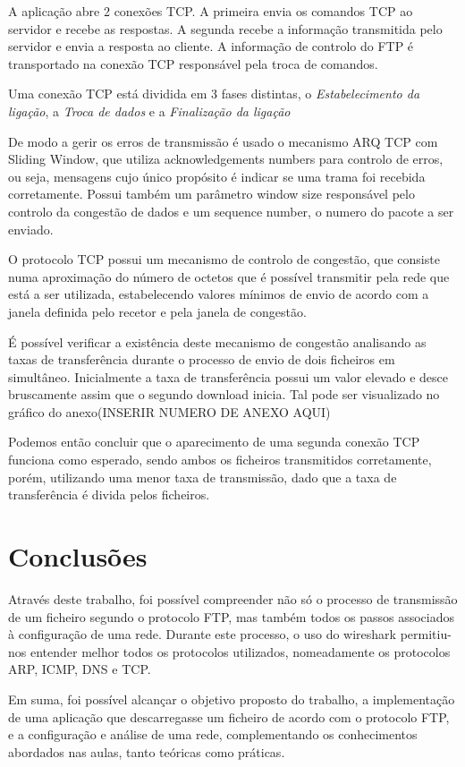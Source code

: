 \documentclass[11pt]{article}
\begin{document}
A aplicação abre 2 conexões TCP. A primeira envia os comandos TCP ao servidor e recebe as respostas. A segunda recebe a informação transmitida pelo servidor e envia a resposta ao cliente. A informação de controlo do FTP é transportado na conexão TCP responsável pela troca de comandos.

Uma conexão TCP está dividida em 3 fases distintas, o \emph{Estabelecimento da ligação}, a \emph{Troca de dados} e a \emph{Finalização da ligação}


De modo a gerir os erros de transmissão é usado o mecanismo ARQ TCP com Sliding Window, que utiliza acknowledgements numbers para controlo de erros, ou seja, mensagens cujo único propósito é indicar se uma trama foi recebida corretamente. Possui também um parâmetro window size responsável pelo controlo da congestão de dados e um sequence number, o numero do pacote a ser enviado.

O protocolo TCP possui um mecanismo de controlo de congestão, que consiste numa aproximação do número de octetos que é possível transmitir pela rede que está a ser utilizada, estabelecendo valores mínimos de envio de acordo com a janela definida pelo recetor e pela janela de congestão.

É possível verificar a existência deste mecanismo de congestão analisando as taxas de transferência durante o processo de envio de dois ficheiros em simultâneo. Inicialmente a taxa de transferência possui um valor elevado e desce bruscamente assim que o segundo download inicia. Tal pode ser visualizado no gráfico do anexo(INSERIR NUMERO DE ANEXO AQUI)

Podemos então concluir que o aparecimento de uma segunda conexão TCP funciona como esperado, sendo ambos os ficheiros transmitidos corretamente, porém, utilizando uma menor taxa de transmissão, dado que a taxa de transferência é divida pelos ficheiros.


\section{Conclusões}

Através deste trabalho, foi possível compreender não só o processo de transmissão de um ficheiro segundo o protocolo FTP, mas também todos os passos associados à configuração de uma rede. Durante este processo, o uso do wireshark permitiu-nos entender melhor todos os protocolos utilizados, nomeadamente os protocolos ARP, ICMP, DNS e TCP.

Em suma, foi possível alcançar o objetivo proposto do trabalho, a implementação de uma aplicação que descarregasse um ficheiro de acordo com o protocolo FTP, e a configuração e análise de uma rede, complementando os conhecimentos abordados nas aulas, tanto teóricas como práticas.
\end{document}
